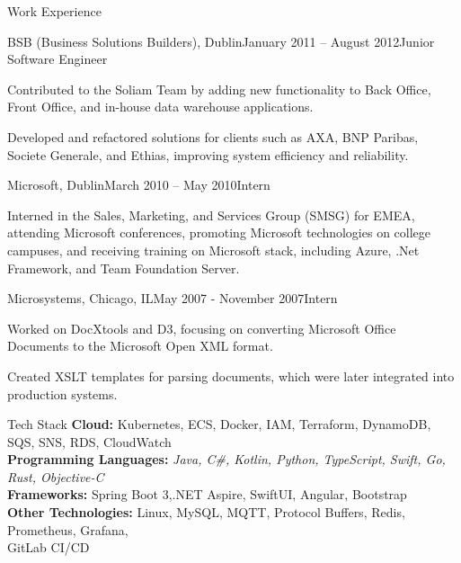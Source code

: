 \documentclass{résumé}
\begin{document}
\begin{rSection}{Work Experience}
\begin{rSubsection}{BSB (Business Solutions Builders), Dublin}{January 2011 – August 2012}{Junior Software Engineer}{}
    \item Contributed to the Soliam Team by adding new functionality to Back Office, Front Office, and in-house data warehouse applications.
    \item Developed and refactored solutions for clients such as AXA, BNP Paribas, Societe Generale, and Ethias, improving system efficiency and reliability.
\end{rSubsection}
\newpage
\begin{rSubsection}{Microsoft, Dublin}{March 2010 – May 2010}{Intern}{}
    \item Interned in the Sales, Marketing, and Services Group (SMSG) for EMEA, attending Microsoft conferences, promoting Microsoft technologies on college campuses, and receiving training on Microsoft stack, including Azure, .Net Framework, and Team Foundation Server.
\end{rSubsection}

\begin{rSubsection}{Microsystems, Chicago, IL}{May 2007 - November 2007}{Intern}{}
    \item Worked on DocXtools and D3, focusing on converting Microsoft Office Documents to the Microsoft Open XML format.
    \item Created XSLT templates for parsing documents, which were later integrated into production systems.
\end{rSubsection}

\end{rSection}

\begin{rSection}{Tech Stack}
\textbf{Cloud:} Kubernetes, ECS, Docker, IAM, Terraform, DynamoDB, SQS, SNS, RDS, CloudWatch \
\\\textbf{Programming Languages:} \textit{Java, C\#, Kotlin, Python, TypeScript, Swift, Go, Rust, Objective-C} \
\\\textbf{Frameworks:} Spring Boot 3,.NET Aspire, SwiftUI, Angular, Bootstrap \
\\\textbf{Other Technologies:} Linux, MySQL, MQTT, Protocol Buffers, Redis, Prometheus, Grafana,
\\ GitLab CI/CD
\end{rSection}
\end{document}
